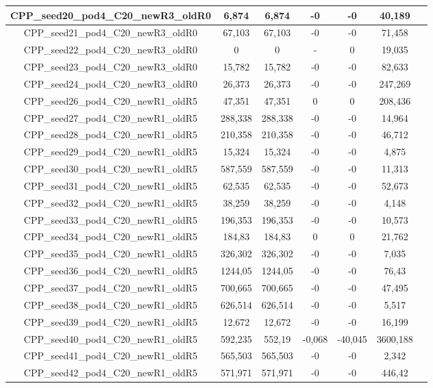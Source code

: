 \documentclass[a4paper]{article}
\begin{document}
\begin{center}
\begin{longtable}{ccccccc}
\hline
CPP\_seed20\_pod4\_C20\_newR3\_oldR0 & 6,874 & 6,874 & -0 & -0 & 40,189\\
\hline
CPP\_seed21\_pod4\_C20\_newR3\_oldR0 & 67,103 & 67,103 & -0 & -0 & 71,458\\
\hline
CPP\_seed22\_pod4\_C20\_newR3\_oldR0 & 0 & 0 & - & 0 & 19,035\\
\hline
CPP\_seed23\_pod4\_C20\_newR3\_oldR0 & 15,782 & 15,782 & -0 & -0 & 82,633\\
\hline
CPP\_seed24\_pod4\_C20\_newR3\_oldR0 & 26,373 & 26,373 & -0 & -0 & 247,269\\
\hline
CPP\_seed26\_pod4\_C20\_newR1\_oldR5 & 47,351 & 47,351 & 0 & 0 & 208,436\\
\hline
CPP\_seed27\_pod4\_C20\_newR1\_oldR5 & 288,338 & 288,338 & -0 & -0 & 14,964\\
\hline
CPP\_seed28\_pod4\_C20\_newR1\_oldR5 & 210,358 & 210,358 & -0 & -0 & 46,712\\
\hline
CPP\_seed29\_pod4\_C20\_newR1\_oldR5 & 15,324 & 15,324 & -0 & -0 & 4,875\\
\hline
CPP\_seed30\_pod4\_C20\_newR1\_oldR5 & 587,559 & 587,559 & -0 & -0 & 11,313\\
\hline
CPP\_seed31\_pod4\_C20\_newR1\_oldR5 & 62,535 & 62,535 & -0 & -0 & 52,673\\
\hline
CPP\_seed32\_pod4\_C20\_newR1\_oldR5 & 38,259 & 38,259 & -0 & -0 & 4,148\\
\hline
CPP\_seed33\_pod4\_C20\_newR1\_oldR5 & 196,353 & 196,353 & -0 & -0 & 10,573\\
\hline
CPP\_seed34\_pod4\_C20\_newR1\_oldR5 & 184,83 & 184,83 & 0 & 0 & 21,762\\
\hline
CPP\_seed35\_pod4\_C20\_newR1\_oldR5 & 326,302 & 326,302 & -0 & -0 & 7,035\\
\hline
CPP\_seed36\_pod4\_C20\_newR1\_oldR5 & 1244,05 & 1244,05 & -0 & -0 & 76,43\\
\hline
CPP\_seed37\_pod4\_C20\_newR1\_oldR5 & 700,665 & 700,665 & -0 & -0 & 47,495\\
\hline
CPP\_seed38\_pod4\_C20\_newR1\_oldR5 & 626,514 & 626,514 & -0 & -0 & 5,517\\
\hline
CPP\_seed39\_pod4\_C20\_newR1\_oldR5 & 12,672 & 12,672 & -0 & -0 & 16,199\\
\hline
CPP\_seed40\_pod4\_C20\_newR1\_oldR5 & 592,235 & 552,19 & -0,068 & -40,045 & 3600,188\\
\hline
CPP\_seed41\_pod4\_C20\_newR1\_oldR5 & 565,503 & 565,503 & -0 & -0 & 2,342\\
\hline
CPP\_seed42\_pod4\_C20\_newR1\_oldR5 & 571,971 & 571,971 & -0 & -0 & 446,42\\

\end{longtable}
\end{center}
\end{document}
